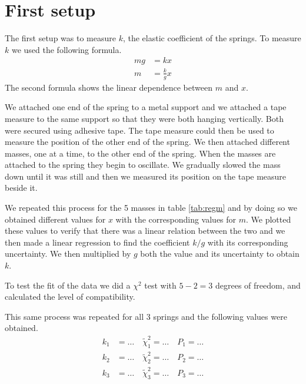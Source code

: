 \documentclass{article}
\begin{document}
\section{First setup} \label{sec:setup1}
The first setup was to measure $k$, the elastic coefficient of the springs. 
To measure $k$ we used the following formula.
\begin{align}
    mg &= kx \\
    m  &= \frac{k}{g}x
\end{align}
The second formula shows the linear dependence between $m$ and $x$.

We attached one end of the spring to a metal support and we attached a tape measure to the same support so that they were both hanging vertically. Both were secured using adhesive tape. The tape measure could then be used to measure the position of the other end of the spring. We then attached different masses, one at a time, to the other end of the spring. When the masses are attached to the spring they begin to oscillate. We gradually slowed the mass down until it was still and then we measured its position on the tape measure beside it. 

We repeated this process for the 5 masses in table \ref{tab:regm} and by doing so we obtained different values for $x$ with the
corresponding values for $m$. We plotted these values to verify that
there was a linear relation between the two and we then made a linear
regression to find the coefficient $k/g$ with its corresponding
uncertainty. We then multiplied by $g$ both the value and its uncertainty to obtain $k$. 

To test the fit of the data we did a $\chi^2$ test with $5-2 = 3$ degrees of freedom, and calculated the level of compatibility.

This same process was repeated for all 3 springs and the following values were obtained.
\begin{align}
    k_1 &= \dots \quad \tilde \chi_1^2 = \dots \quad P_1 = \dots \\
    k_2 &= \dots \quad \tilde \chi_2^2 = \dots \quad P_2 = \dots \\
    k_3 &= \dots \quad \tilde \chi_3^2 = \dots \quad P_3 = \dots 
\end{align}
\end{document}
